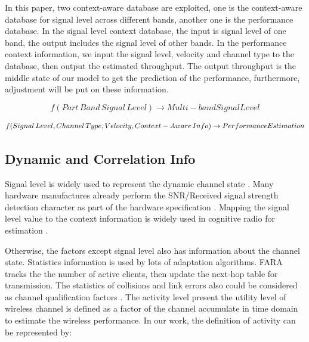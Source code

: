 In this paper, two context-aware database are exploited, one is the context-aware database for signal level across different bands, another one is the performance database. 
In the signal level context database, the input is signal level of one band, the output includes the signal level of other bands.
In the performance context information, we input the signal level, velocity and channel type to the database, then output the estimated throughput.  
The output throughput is the middle state of our model to get the prediction of the performance, furthermore, adjustment will be put on these information. 


\begin{equation}
f(Part\, Band\, Signal\, Level) \rightarrow Multi-band Signal Level
\end{equation}

\begin{equation}
f(Signal\, Level,Channel\, Type, Velocity, \\ 
Context-Aware\, Info) \rightarrow Performance Estimation
\end{equation}




\subsection{Dynamic and Correlation Info}

Signal level is widely used to represent the dynamic channel state  \cite{rahul2009frequency}. 
Many hardware manufactures already perform the SNR/Received signal strength detection character as part of the hardware specification \cite{edalat2006measured}. 
Mapping the signal level value to the context information is widely used in cognitive radio for estimation \cite{laneman2000energy,laneman2001efficient}. 

Otherwise, the factors except signal level also has information about the channel state. Statistics information is used by lots of adaptation algorithms.
FARA tracks the the number of active clients, then update the next-hop table for transmission\cite{rahul2009frequency}.
The statistics of collisions and link errors also could be considered as channel qualification factors \cite{pang2005rate}.
The activity level present the utility level of wireless channel is defined as a factor of the channel accumulate in time domain to estimate the wireless performance.
In our work, the definition of activity can be represented by:

